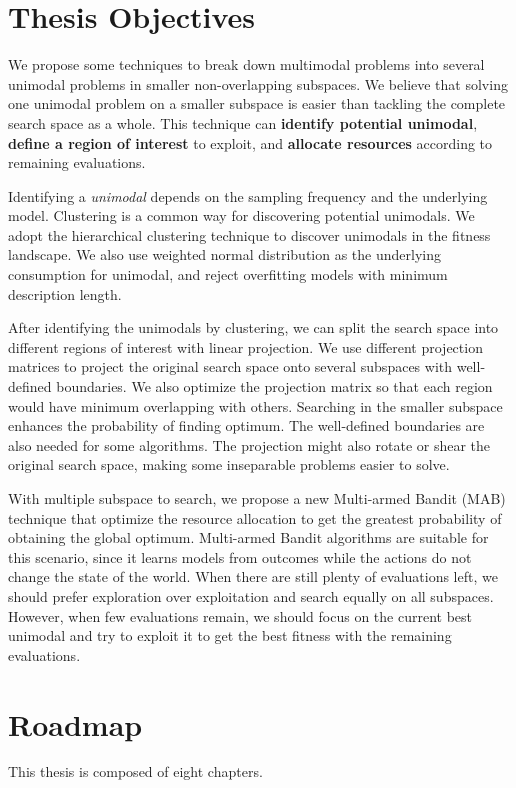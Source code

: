 \section{Thesis Objectives}
We propose some techniques to break down multimodal problems into several unimodal problems in smaller non-overlapping subspaces.
We believe that solving one unimodal problem on a smaller subspace is easier than tackling the complete search space as a whole.
This technique can \textbf{identify potential unimodal},
\textbf{define a region of interest} to exploit, 
and \textbf{allocate resources} according to remaining evaluations.

Identifying a \textit{unimodal} depends on the sampling frequency and the underlying model.
Clustering is a common way for discovering potential unimodals.
We adopt the hierarchical clustering technique to discover unimodals in the fitness landscape.
We also use weighted normal distribution as the underlying consumption for unimodal, and reject overfitting models with minimum description length.

After identifying the unimodals by clustering, we can split the search space into different regions of interest with linear projection.
We use different projection matrices to project the original search space onto several subspaces with well-defined boundaries.
We also optimize the projection matrix so that each region would have minimum overlapping with others.
Searching in the smaller subspace enhances the probability of finding optimum.
The well-defined boundaries are also needed for some algorithms.
The projection might also rotate or shear the original search space, making some inseparable problems easier to solve.

With multiple subspace to search, we propose a new Multi-armed Bandit (MAB) technique 
that optimize the resource allocation to get the greatest probability of obtaining the global optimum.
Multi-armed Bandit algorithms are suitable for this scenario, 
since it learns models from outcomes while the actions do not change the state of the world.
When there are still plenty of evaluations left, we should prefer exploration over exploitation and search equally on all subspaces.
However, when few evaluations remain, we should focus on the current best unimodal 
and try to exploit it to get the best fitness with the remaining evaluations.  


\section{Roadmap}
This thesis is composed of eight chapters.

